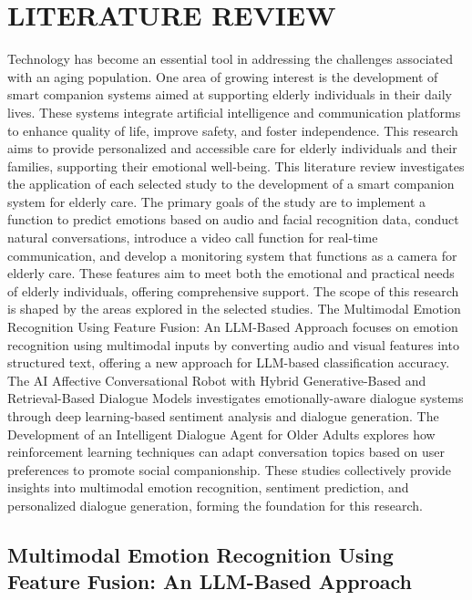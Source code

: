\chapter{LITERATURE REVIEW}

\hspace{\parindent} 
Technology has become an essential tool in addressing the challenges associated with an aging population. One area of growing interest is the development of smart companion systems aimed at supporting elderly individuals in their daily lives. These systems integrate artificial intelligence and communication platforms to enhance quality of life, improve safety, and foster independence. This research aims to provide personalized and accessible care for elderly individuals and their families, supporting their emotional well-being.
This literature review investigates the application of each selected study to the development of a smart companion system for elderly care. The primary goals of the study are to implement a function to predict emotions based on audio and facial recognition data, conduct natural conversations, introduce a video call function for real-time communication, and develop a monitoring system that functions as a camera for elderly care. These features aim to meet both the emotional and practical needs of elderly individuals, offering comprehensive support.
The scope of this research is shaped by the areas explored in the selected studies. The Multimodal Emotion Recognition Using Feature Fusion: An LLM-Based Approach focuses on emotion recognition using multimodal inputs by converting audio and visual features into structured text, offering a new approach for LLM-based classification accuracy. The AI Affective Conversational Robot with Hybrid Generative-Based and Retrieval-Based Dialogue Models investigates emotionally-aware dialogue systems through deep learning-based sentiment analysis and dialogue generation. The Development of an Intelligent Dialogue Agent for Older Adults explores how reinforcement learning techniques can adapt conversation topics based on user preferences to promote social companionship. These studies collectively provide insights into multimodal emotion recognition, sentiment prediction, and personalized dialogue generation, forming the foundation for this research.


\setcounter{chapter}{2}
\section[Multimodal Emotion Recognition Using Feature Fusion: An LLM-Based Approach]{Multimodal Emotion Recognition Using Feature Fusion: An LLM-Based Approach \cite{paper_1}}

